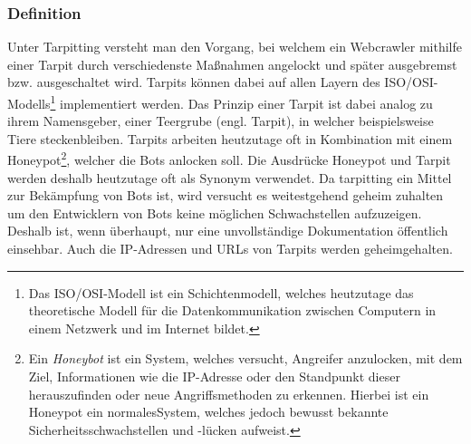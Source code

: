 \subsubsection{Definition}
Unter Tarpitting versteht man den Vorgang, bei welchem ein Webcrawler mithilfe einer Tarpit durch verschiedenste Maßnahmen angelockt und später ausgebremst bzw. ausgeschaltet wird. Tarpits können dabei auf allen Layern des ISO/OSI-Modells\footnote{Das ISO/OSI-Modell ist ein Schichtenmodell, welches heutzutage das theoretische Modell für die Datenkommunikation zwischen Computern in einem Netzwerk und im Internet bildet\cite[430]{gallenbacher-iso-osi}.} implementiert werden\cite{tarpit-wikipedia}. Das Prinzip einer Tarpit ist dabei analog zu ihrem Namensgeber, einer Teergrube (engl. Tarpit), in welcher beispielsweise Tiere steckenbleiben. Tarpits arbeiten heutzutage oft in Kombination mit einem Honeypot\footnote{Ein \emph{Honeybot} ist ein System, welches versucht, Angreifer anzulocken, mit dem Ziel, Informationen wie die IP-Adresse oder den Standpunkt dieser herauszufinden oder neue Angriffsmethoden zu erkennen. Hierbei ist ein Honeypot ein \glqq normales\grqq\space System, welches jedoch bewusst bekannte Sicherheitsschwachstellen und -lücken aufweist\cite{def-honeybot}.}, welcher die Bots anlocken soll. Die Ausdrücke Honeypot und Tarpit werden deshalb heutzutage oft als Synonym verwendet\cite{honeypot-tarpit-synonym}.
Da tarpitting ein Mittel zur Bekämpfung von Bots ist, wird versucht es weitestgehend geheim zuhalten um den Entwicklern von Bots keine möglichen Schwachstellen aufzuzeigen. Deshalb ist, wenn überhaupt, nur eine unvollständige Dokumentation öffentlich einsehbar. Auch die IP-Adressen und URLs von Tarpits werden geheimgehalten.
\label{subsub:tarpitting}